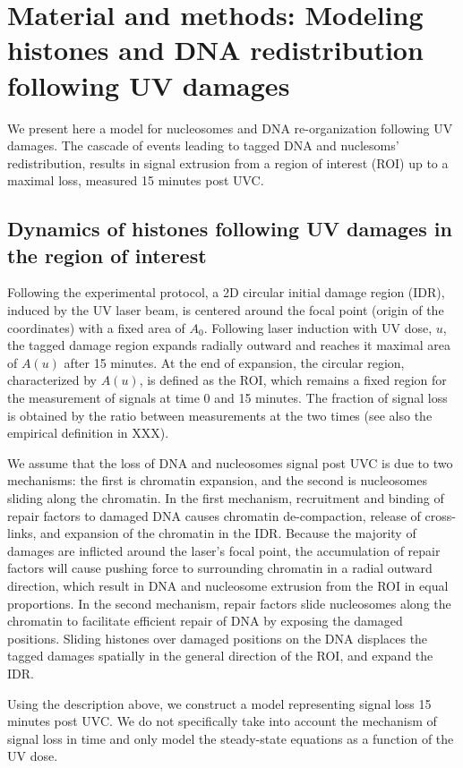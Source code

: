 \documentclass[12pt]{article}
\begin{document}
\section{Material and methods: Modeling  histones and DNA redistribution following UV damages}
We present here a model for nucleosomes and DNA re-organization following UV damages. The cascade of events leading to tagged DNA and nuclesoms'  redistribution, results in signal extrusion from a region of interest (ROI) up to a maximal loss, measured 15 minutes post UVC. 

\subsection{Dynamics of histones following UV damages in the region of interest}

Following the experimental protocol, a 2D circular initial damage region (IDR), induced by the UV laser beam, is centered around the focal point (origin of the coordinates) with a fixed area of $A_0$. Following laser induction with UV dose, $u$, the tagged damage region expands radially outward and reaches it maximal area of $A(u)$ after 15 minutes. At the end of expansion, the circular region, characterized by $A(u)$, is defined as the ROI, which remains a fixed region for the measurement of signals at time 0 and 15 minutes. The fraction of signal loss is obtained by the ratio between measurements at the two times (see also the empirical definition in XXX). 

We assume that the loss of DNA and nucleosomes signal post UVC is due to two mechanisms: the first is chromatin expansion, and the second is nucleosomes sliding along the chromatin. In the first mechanism, recruitment and binding of repair factors to damaged DNA causes chromatin de-compaction, release of cross-links, and expansion of the chromatin in the IDR. Because the majority of damages are inflicted around the laser's focal point, the accumulation of repair factors will cause pushing force to surrounding chromatin in a radial outward direction, which result in DNA and nucleosome extrusion from the ROI in equal proportions. In the second mechanism, repair factors slide nucleosomes along the chromatin to facilitate efficient repair of DNA by exposing the damaged positions. 
Sliding histones over damaged positions on the DNA displaces the tagged damages spatially in the general direction of the ROI, and expand the IDR. 
 
Using the description above, we construct a model representing signal loss 15 minutes post UVC. We do not specifically take into account the mechanism of signal loss in time and only model the steady-state equations as a function of the UV dose.
\end{document}
